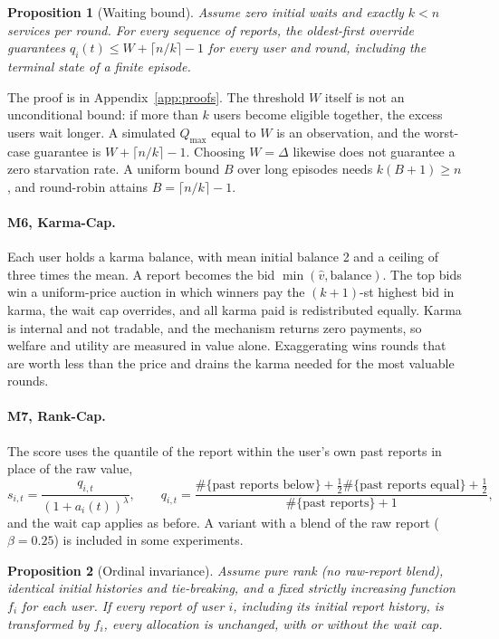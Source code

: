\documentclass{article}
\theoremstyle{plain}
\newtheorem{proposition}{Proposition}
\theoremstyle{definition}
\newcommand{\Qmax}{Q_{\max}}
\begin{document}
\begin{proposition}[Waiting bound]
\label{prop:wait}
Assume zero initial waits and exactly $k<n$ services per round.
For every sequence of reports, the oldest-first override guarantees $q_i(t)\le W+\lceil n/k\rceil-1$ for every user and round, including the terminal state of a finite episode.
\end{proposition}

The proof is in Appendix~\ref{app:proofs}.
The threshold $W$ itself is not an unconditional bound: if more than $k$ users become eligible together, the excess users wait longer.
A simulated $\Qmax$ equal to $W$ is an observation, and the worst-case guarantee is $W+\lceil n/k\rceil-1$. Choosing $W=\Delta$ likewise does not guarantee a zero starvation rate.
A uniform bound $B$ over long episodes needs $k(B+1)\ge n$, and round-robin attains $B=\lceil n/k\rceil-1$.

\paragraph{M6, Karma-Cap.}
Each user holds a karma balance, with mean initial balance 2 and a ceiling of three times the mean.
A report becomes the bid $\min(\hat v,\text{balance})$.
The top bids win a uniform-price auction in which winners pay the $(k+1)$-st highest bid in karma, the wait cap overrides, and all karma paid is redistributed equally.
Karma is internal and not tradable, and the mechanism returns zero payments, so welfare and utility are measured in value alone.
Exaggerating wins rounds that are worth less than the price and drains the karma needed for the most valuable rounds.

\paragraph{M7, Rank-Cap.}
The score uses the quantile of the report within the user's own past reports in place of the raw value,
\begin{equation}
s_{i,t}=\frac{q_{i,t}}{(1+a_i(t))^{\lambda}},\qquad q_{i,t}=\frac{\#\{\text{past reports below}\}+\tfrac12\#\{\text{past reports equal}\}+\tfrac12}{\#\{\text{past reports}\}+1},
\end{equation}
and the wait cap applies as before.
A variant with a blend of the raw report ($\beta=0.25$) is included in some experiments.

\begin{proposition}[Ordinal invariance]
\label{prop:rank}
Assume pure rank (no raw-report blend), identical initial histories and tie-breaking, and a fixed strictly increasing function $f_i$ for each user.
If every report of user $i$, including its initial report history, is transformed by $f_i$, every allocation is unchanged, with or without the wait cap.
\end{proposition}
\end{document}
